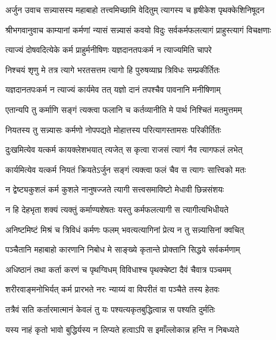 {अर्जुन उवाच}
\twolineshloka
{सन्न्यासस्य महाबाहो तत्त्वमिच्छामि वेदितुम्}
{त्यागस्य च हृषीकेश पृथक्केशिनिषूदन}%

{श्रीभगवानुवाच}
\twolineshloka
{काम्यानां कर्मणां न्यासं सन्न्यासं कवयो विदुः}
{सर्वकर्मफलत्यागं प्राहुस्त्यागं विचक्षणाः}%

\twolineshloka
{त्याज्यं दोषवदित्येके कर्म प्राहुर्मनीषिणः}
{यज्ञदानतपःकर्म न त्याज्यमिति चापरे}%

\twolineshloka
{निश्चयं शृणु मे तत्र त्यागे भरतसत्तम}
{त्यागो हि पुरुषव्याघ्र त्रिविधः सम्प्रकीर्तितः}%

\twolineshloka
{यज्ञदानतपःकर्म न त्याज्यं कार्यमेव तत्}
{यज्ञो दानं तपश्चैव पावनानि मनीषिणाम्}%

\twolineshloka
{एतान्यपि तु कर्माणि सङ्गं त्यक्त्वा फलानि च}
{कर्तव्यानीति मे पार्थ निश्चितं मतमुत्तमम्}%

\twolineshloka
{नियतस्य तु सन्न्यासः कर्मणो नोपपद्यते}
{मोहात्तस्य परित्यागस्तामसः परिकीर्तितः}%

\twolineshloka
{दुःखमित्येव यत्कर्म कायक्लेशभयात् त्यजेत्}
{स कृत्वा राजसं त्यागं नैव त्यागफलं लभेत्}%

\twolineshloka
{कार्यमित्येव यत्कर्म नियतं क्रियतेऽर्जुन}
{सङ्गं त्यक्त्वा फलं चैव स त्यागः सात्त्विको मतः}%

\twolineshloka
{न द्वेष्ट्यकुशलं कर्म कुशले नानुषज्जते}
{त्यागी सत्त्वसमाविष्टो मेधावी छिन्नसंशयः}%

\twolineshloka
{न हि देहभृता शक्यं त्यक्तुं कर्माण्यशेषतः}
{यस्तु कर्मफलत्यागी स त्यागीत्यभिधीयते}%

\twolineshloka
{अनिष्टमिष्टं मिश्रं च त्रिविधं कर्मणः फलम्}
{भवत्यत्यागिनां प्रेत्य न तु सन्न्यासिनां क्वचित्}%

\twolineshloka
{पञ्चैतानि महाबाहो कारणानि निबोध मे}
{साङ्ख्ये कृतान्ते प्रोक्तानि सिद्धये सर्वकर्मणाम्}%

\twolineshloka
{अधिष्ठानं तथा कर्ता करणं च पृथग्विधम्}
{विविधाश्च पृथक्चेष्टा दैवं चैवात्र पञ्चमम्}%

\twolineshloka
{शरीरवाङ्मनोभिर्यत् कर्म प्रारभते नरः}
{न्याय्यं वा विपरीतं वा पञ्चैते तस्य हेतवः}%

\twolineshloka
{तत्रैवं सति कर्तारमात्मानं केवलं तु यः}
{पश्यत्यकृतबुद्धित्वान्न स पश्यति दुर्मतिः}%

\twolineshloka
{यस्य नाहं कृतो भावो बुद्धिर्यस्य न लिप्यते}
{हत्वाऽपि स इमाँल्लोकान्न हन्ति न निबध्यते}%

